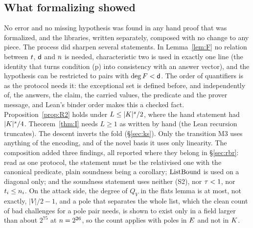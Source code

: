 \subsection{What formalizing showed}

No error and no missing hypothesis was found in any hand proof that was formalized, and the libraries, written separately, composed with no change to any piece. The process did sharpen several statements. In Lemma~\ref{lem:F} no relation between $t$, $\mathsf{d}$ and $n$ is needed, characteristic two is used in exactly one line (the identity that turns condition (p) into consistency with an answer vector), and the hypothesis can be restricted to pairs with $\deg F<\mathsf{d}$. The order of quantifiers is as the protocol needs it: the exceptional set is defined before, and independently of, the answers, the claim, the carried values, the predicate and the prover message, and Lean's binder order makes this a checked fact. Proposition~\ref{prop:R2} holds under $L\le|K|^s/2$, where the hand statement had $|K|^s/4$. Theorem~\ref{thm:I} needs $L\ge1$ as written by hand (the Lean recursion truncates). The descent inverts the fold (\S\ref{sec:ks}). Only the transition M3 uses anything of the encoding, and of the novel basis it uses only linearity. The composition added three findings, all reported where they belong in \S\ref{sec:rbr}: read as one protocol, the statement must be the relativised one with the canonical predicate, plain soundness being a corollary; $\mathrm{ListBound}$ is used on a diagonal only; and the soundness statement uses neither (S2), nor $\tau<1$, nor $t_i\le n_i$. On the attack side, the degree of $Q_V$ in the flats lemma is at most, not exactly, $|V|/2-1$, and a pole that separates the whole list, which the clean count of bad challenges for a pole pair needs, is shown to exist only in a field larger than about $2^{75}$ at $n=2^{26}$, so the count applies with poles in $E$ and not in $K$.
